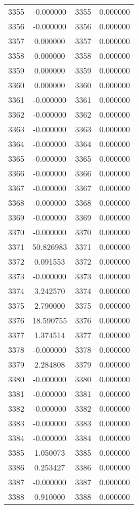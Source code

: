 \documentclass[12pt]{article}
\begin{document}
\begin{longtable}{@{}cccc@{}}
3355 & -0.000000 & 3355 & 0.000000 \\
3356 & -0.000000 & 3356 & 0.000000 \\
3357 & 0.000000 & 3357 & 0.000000 \\
3358 & 0.000000 & 3358 & 0.000000 \\
3359 & 0.000000 & 3359 & 0.000000 \\
3360 & 0.000000 & 3360 & 0.000000 \\
3361 & -0.000000 & 3361 & 0.000000 \\
3362 & -0.000000 & 3362 & 0.000000 \\
3363 & -0.000000 & 3363 & 0.000000 \\
3364 & -0.000000 & 3364 & 0.000000 \\
3365 & -0.000000 & 3365 & 0.000000 \\
3366 & -0.000000 & 3366 & 0.000000 \\
3367 & -0.000000 & 3367 & 0.000000 \\
3368 & -0.000000 & 3368 & 0.000000 \\
3369 & -0.000000 & 3369 & 0.000000 \\
3370 & -0.000000 & 3370 & 0.000000 \\
3371 & 50.826983 & 3371 & 0.000000 \\
3372 & 0.091553 & 3372 & 0.000000 \\
3373 & -0.000000 & 3373 & 0.000000 \\
3374 & 3.242570 & 3374 & 0.000000 \\
3375 & 2.790000 & 3375 & 0.000000 \\
3376 & 18.590755 & 3376 & 0.000000 \\
3377 & 1.374514 & 3377 & 0.000000 \\
3378 & -0.000000 & 3378 & 0.000000 \\
3379 & 2.284808 & 3379 & 0.000000 \\
3380 & -0.000000 & 3380 & 0.000000 \\
3381 & -0.000000 & 3381 & 0.000000 \\
3382 & -0.000000 & 3382 & 0.000000 \\
3383 & -0.000000 & 3383 & 0.000000 \\
3384 & -0.000000 & 3384 & 0.000000 \\
3385 & 1.050073 & 3385 & 0.000000 \\
3386 & 0.253427 & 3386 & 0.000000 \\
3387 & -0.000000 & 3387 & 0.000000 \\
3388 & 0.910000 & 3388 & 0.000000 \\

\end{longtable}
\end{document}
